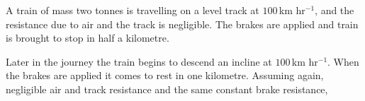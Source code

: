 \documentclass[a4paper,12pt,answers]{exam}
\begin{document}
\unframedsolutions

\begin{center}
\end{center}

\begin{questions}
\question A train of mass two tonnes is travelling on a level track at $100\,$km hr$^{-1}$, and the resistance due to air and the track is negligible. 
    The brakes are applied and train is brought to stop in half a kilometre.
    Later in the journey the train begins to descend an incline at $100\,$km hr$^{-1}$. 
    When the brakes are applied it comes to rest in one kilometre. 
    Assuming again, negligible air and track resistance and the same constant brake resistance,
    \begin{parts}
        \setcounter{partno}{1}

\end{parts}
\end{questions}
\end{document}
